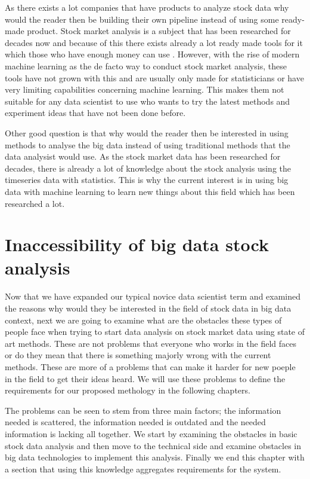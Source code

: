 As there exists a lot companies that have products to analyze stock data why would the reader then be building their own pipeline instead of using some ready-made product.
Stock market analysis is a subject that has been researched for decades now and because of this there exists already a lot ready made tools for it which those who have enough money can use \cite{metastock} \cite{worden}.
However, with the rise of modern machine learning as the de facto way to conduct stock market analysis, these tools have not grown with this and are usually only made for statisticians or have very limiting capabilities concerning machine learning.
This makes them not suitable for any data scientist to use who wants to try the latest methods and experiment ideas that have not been done before.

Other good question is that why would the reader then be interested in using methods to analyse the big data instead of using traditional methods that the data analysist would use.
As the stock market data has been researched for decades, there is already a lot of knowledge about the stock analysis using the timeseries data with statistics.
This is why the current interest is in using big data with machine learning to learn new things about this field which has been researched a lot.


\section{Inaccessibility of big data stock analysis}

Now that we have expanded our typical novice data scientist term and examined the reasons why would they be interested in the field of stock data in big data context, next we are going to examine what are the obstacles these types of people face when trying to start data analysis on stock market data using state of art methods.
These are not problems that everyone who works in the field faces or do they mean that there is something majorly wrong with the current methods.
These are more of a problems that can make it harder for new poeple in the field to get their ideas heard.
We will use these problems to define the requirements for our proposed methology in the following chapters.

The problems can be seen to stem from three main factors; the information needed is scattered, the information needed is outdated and the needed information is lacking all together.
We start by examining the obstacles in basic stock data analysis and then move to the technical side and examine obstacles in big data technologies to implement this analysis.
Finally we end this chapter with a section that using this knowledge aggregates requirements for the system.

